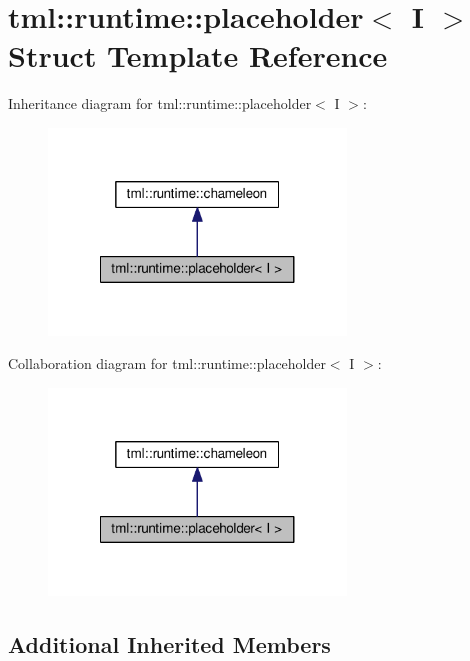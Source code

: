 \hypertarget{structtml_1_1runtime_1_1placeholder}{\section{tml\+:\+:runtime\+:\+:placeholder$<$ I $>$ Struct Template Reference}
\label{structtml_1_1runtime_1_1placeholder}
}


Inheritance diagram for tml\+:\+:runtime\+:\+:placeholder$<$ I $>$\+:
\nopagebreak
\begin{figure}[H]
\begin{center}
\leavevmode
\includegraphics[width=224pt]{structtml_1_1runtime_1_1placeholder__inherit__graph}
\end{center}
\end{figure}


Collaboration diagram for tml\+:\+:runtime\+:\+:placeholder$<$ I $>$\+:
\nopagebreak
\begin{figure}[H]
\begin{center}
\leavevmode
\includegraphics[width=224pt]{structtml_1_1runtime_1_1placeholder__coll__graph}
\end{center}
\end{figure}
\subsection*{Additional Inherited Members}


